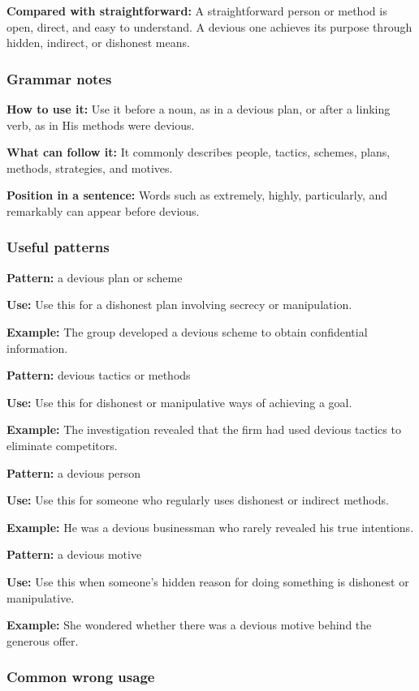 \documentclass[11pt]{article}
\begin{document}
\textbf{Compared with straightforward:} A straightforward person or method is open, direct, and easy to understand. A devious one achieves its purpose through hidden, indirect, or dishonest means.

\subsubsection{Grammar notes}
\textbf{How to use it:} Use it before a noun, as in a devious plan, or after a linking verb, as in His methods were devious.

\textbf{What can follow it:} It commonly describes people, tactics, schemes, plans, methods, strategies, and motives.

\textbf{Position in a sentence:} Words such as extremely, highly, particularly, and remarkably can appear before devious.

\subsubsection{Useful patterns}
\textbf{Pattern:} a devious plan or scheme

\textbf{Use:} Use this for a dishonest plan involving secrecy or manipulation.

\textbf{Example:} The group developed a devious scheme to obtain confidential information.

\textbf{Pattern:} devious tactics or methods

\textbf{Use:} Use this for dishonest or manipulative ways of achieving a goal.

\textbf{Example:} The investigation revealed that the firm had used devious tactics to eliminate competitors.

\textbf{Pattern:} a devious person

\textbf{Use:} Use this for someone who regularly uses dishonest or indirect methods.

\textbf{Example:} He was a devious businessman who rarely revealed his true intentions.

\textbf{Pattern:} a devious motive

\textbf{Use:} Use this when someone's hidden reason for doing something is dishonest or manipulative.

\textbf{Example:} She wondered whether there was a devious motive behind the generous offer.

\subsubsection{Common wrong usage}
\end{document}
